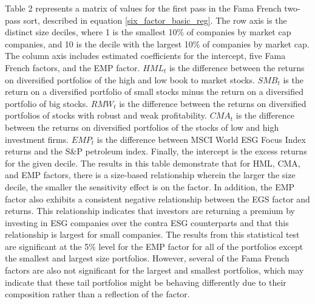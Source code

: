 Table 2 represents a matrix of values for the first pass in the Fama French two-pass sort, described in equation \eqref{six_factor_basic_reg}. The row axis is the distinct size deciles, where 1 is the smallest 10\% of companies by market cap companies, and 10 is the decile with the largest 10\% of companies by market cap. The column axis includes estimated coefficients for the intercept, five Fama French factors, and the EMP factor. $HML_{t}$ is the difference between the returns on diversified portfolios of the high and low book to market stocks.  $SMB_{t}$ is the return on a diversified portfolio of small stocks minus the return on a diversified portfolio of big stocks. $RMW_t$ is the difference between the returns on diversified portfolios of stocks with robust and weak profitability. $CMA_{t}$ is the difference between the returns on diversified portfolios of the stocks of low and high investment firms. $EMP_t$ is the difference between MSCI World ESG Focus Index returns and the S\&P petroleum index. Finally, the intercept is the excess returns for the given decile. The results in this table demonstrate that for HML, CMA, and EMP factors, there is a size-based relationship wherein the larger the size decile, the smaller the sensitivity effect is on the factor. In addition, the EMP factor also exhibits a consistent negative relationship between the EGS factor and returns. This relationship indicates that investors are returning a premium by investing in ESG companies over the contra ESG counterparts and that this relationship is largest for small companies. The results from this statistical test are significant at the 5\% level for the EMP factor for all of the portfolios except the smallest and largest size portfolios. However, several of the Fama French factors are also not significant for the largest and smallest portfolios, which may indicate that these tail portfolios might be behaving differently due to their composition rather than a reflection of the factor. 


